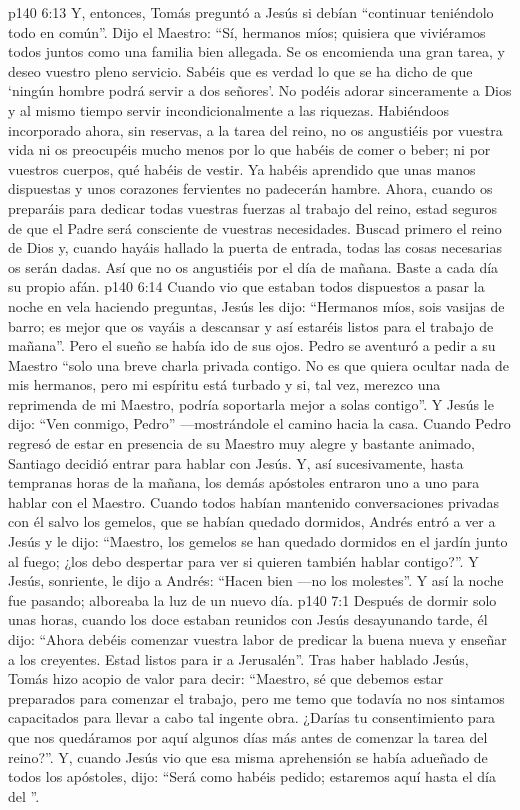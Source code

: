 \vs p140 6:13 Y, entonces, Tomás preguntó a Jesús si debían “continuar teniéndolo todo en común”. Dijo el Maestro: “Sí, hermanos míos; quisiera que viviéramos todos juntos como una familia bien allegada. Se os encomienda una gran tarea, y deseo vuestro pleno servicio. Sabéis que es verdad lo que se ha dicho de que ‘ningún hombre podrá servir a dos señores’. No podéis adorar sinceramente a Dios y al mismo tiempo servir incondicionalmente a las riquezas. Habiéndoos incorporado ahora, sin reservas, a la tarea del reino, no os angustiéis por vuestra vida ni os preocupéis mucho menos por lo que habéis de comer o beber; ni por vuestros cuerpos, qué habéis de vestir. Ya habéis aprendido que unas manos dispuestas y unos corazones fervientes no padecerán hambre. Ahora, cuando os preparáis para dedicar todas vuestras fuerzas al trabajo del reino, estad seguros de que el Padre será consciente de vuestras necesidades. Buscad primero el reino de Dios y, cuando hayáis hallado la puerta de entrada, todas las cosas necesarias os serán dadas. Así que no os angustiéis por el día de mañana. Baste a cada día su propio afán.
\vs p140 6:14 Cuando vio que estaban todos dispuestos a pasar la noche en vela haciendo preguntas, Jesús les dijo: “Hermanos míos, sois vasijas de barro; es mejor que os vayáis a descansar y así estaréis listos para el trabajo de mañana”. Pero el sueño se había ido de sus ojos. Pedro se aventuró a pedir a su Maestro “solo una breve charla privada contigo. No es que quiera ocultar nada de mis hermanos, pero mi espíritu está turbado y si, tal vez, merezco una reprimenda de mi Maestro, podría soportarla mejor a solas contigo”. Y Jesús le dijo: “Ven conmigo, Pedro” ---mostrándole el camino hacia la casa. Cuando Pedro regresó de estar en presencia de su Maestro muy alegre y bastante animado, Santiago decidió entrar para hablar con Jesús. Y, así sucesivamente, hasta tempranas horas de la mañana, los demás apóstoles entraron uno a uno para hablar con el Maestro. Cuando todos habían mantenido conversaciones privadas con él salvo los gemelos, que se habían quedado dormidos, Andrés entró a ver a Jesús y le dijo: “Maestro, los gemelos se han quedado dormidos en el jardín junto al fuego; ¿los debo despertar para ver si quieren también hablar contigo?”. Y Jesús, sonriente, le dijo a Andrés: “Hacen bien ---no los molestes”. Y así la noche fue pasando; alboreaba la luz de un nuevo día.
\vs p140 7:1 Después de dormir solo unas horas, cuando los doce estaban reunidos con Jesús desayunando tarde, él dijo: “Ahora debéis comenzar vuestra labor de predicar la buena nueva y enseñar a los creyentes. Estad listos para ir a Jerusalén”. Tras haber hablado Jesús, Tomás hizo acopio de valor para decir: “Maestro, sé que debemos estar preparados para comenzar el trabajo, pero me temo que todavía no nos sintamos capacitados para llevar a cabo tal ingente obra. ¿Darías tu consentimiento para que nos quedáramos por aquí algunos días más antes de comenzar la tarea del reino?”. Y, cuando Jesús vio que esa misma aprehensión se había adueñado de todos los apóstoles, dijo: “Será como habéis pedido; estaremos aquí hasta el día del ”.
